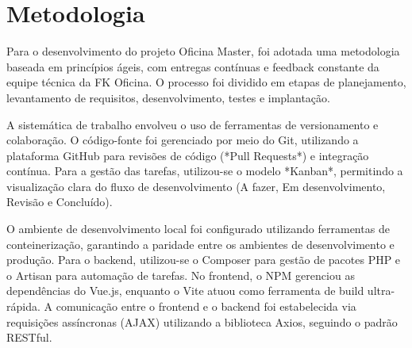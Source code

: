 
\chapter{Metodologia}
\label{cap:metodologia}

Para o desenvolvimento do projeto Oficina Master, foi adotada uma metodologia baseada em princípios ágeis, com entregas contínuas e feedback constante da equipe técnica da FK Oficina. O processo foi dividido em etapas de planejamento, levantamento de requisitos, desenvolvimento, testes e implantação.

A sistemática de trabalho envolveu o uso de ferramentas de versionamento e colaboração. O código-fonte foi gerenciado por meio do Git, utilizando a plataforma GitHub para revisões de código (*Pull Requests*) e integração contínua. Para a gestão das tarefas, utilizou-se o modelo *Kanban*, permitindo a visualização clara do fluxo de desenvolvimento (A fazer, Em desenvolvimento, Revisão e Concluído).

O ambiente de desenvolvimento local foi configurado utilizando ferramentas de conteinerização, garantindo a paridade entre os ambientes de desenvolvimento e produção. Para o backend, utilizou-se o Composer para gestão de pacotes PHP e o Artisan para automação de tarefas. No frontend, o NPM gerenciou as dependências do Vue.js, enquanto o Vite atuou como ferramenta de build ultra-rápida. A comunicação entre o frontend e o backend foi estabelecida via requisições assíncronas (AJAX) utilizando a biblioteca Axios, seguindo o padrão RESTful.
